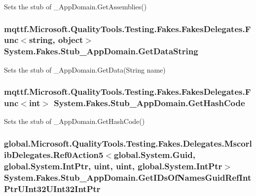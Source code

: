 Sets the stub of \-\_\-\-App\-Domain.\-Get\-Assemblies()

\hypertarget{class_system_1_1_fakes_1_1_stub___app_domain_a1ec31889301e778c71ae0d85fa2cfcb5}{
\subsubsection[{Get\-Data\-String}]{\setlength{\rightskip}{0pt plus 5cm}mqttf.\-Microsoft.\-Quality\-Tools.\-Testing.\-Fakes.\-Fakes\-Delegates.\-Func$<$string, object$>$ System.\-Fakes.\-Stub\-\_\-\-App\-Domain.\-Get\-Data\-String}}\label{class_system_1_1_fakes_1_1_stub___app_domain_a1ec31889301e778c71ae0d85fa2cfcb5}


Sets the stub of \-\_\-\-App\-Domain.\-Get\-Data(\-String name)

\hypertarget{class_system_1_1_fakes_1_1_stub___app_domain_a5c0ff9ac38be96129be6e357e576bf22}{
\subsubsection[{Get\-Hash\-Code}]{\setlength{\rightskip}{0pt plus 5cm}mqttf.\-Microsoft.\-Quality\-Tools.\-Testing.\-Fakes.\-Fakes\-Delegates.\-Func$<$int$>$ System.\-Fakes.\-Stub\-\_\-\-App\-Domain.\-Get\-Hash\-Code}}\label{class_system_1_1_fakes_1_1_stub___app_domain_a5c0ff9ac38be96129be6e357e576bf22}


Sets the stub of \-\_\-\-App\-Domain.\-Get\-Hash\-Code()

\hypertarget{class_system_1_1_fakes_1_1_stub___app_domain_a869481343cf0c39deef9087376bb2974}{
\subsubsection[{Get\-I\-Ds\-Of\-Names\-Guid\-Ref\-Int\-Ptr\-U\-Int32\-U\-Int32\-Int\-Ptr}]{\setlength{\rightskip}{0pt plus 5cm}global.\-Microsoft.\-Quality\-Tools.\-Testing.\-Fakes.\-Delegates.\-Mscorlib\-Delegates.\-Ref0\-Action5$<$global.\-System.\-Guid, global.\-System.\-Int\-Ptr, uint, uint, global.\-System.\-Int\-Ptr$>$ System.\-Fakes.\-Stub\-\_\-\-App\-Domain.\-Get\-I\-Ds\-Of\-Names\-Guid\-Ref\-Int\-Ptr\-U\-Int32\-U\-Int32\-Int\-Ptr}}\label{class_system_1_1_fakes_1_1_stub___app_domain_a869481343cf0c39deef9087376bb2974}


